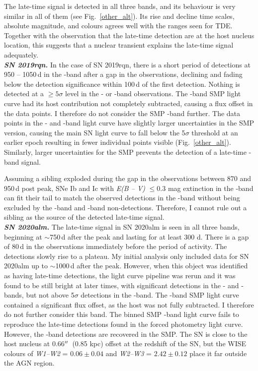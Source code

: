 \documentclass[a4paper,oneside,12pt, class=Latex/Classes/PhDthesisPSnPDF, crop=false]{standalone}
\begin{document}
The late-time signal is detected in all three bands, and its behaviour is very similar in all of them (see Fig.~\ref{other_alt}). Its rise and decline time scales, absolute magnitude, and colours agrees well with the ranges seen for TDE. Together with the observation that the late-time detection are at the host nucleus location, this suggests that a nuclear transient explains the late-time signal adequately.\\

\textit{\textbf{SN 2019rqn.}}
In the case of SN 2019rqn, there is a short period of detections at 950 -- 1050\,d in the \ztfr-band after a gap in the observations, declining and fading below the detection significance within 100\,d of the first detection. Nothing is detected at a $\geq 5 \sigma$ level in the \ztfg- or \ztfi-band observations. The \ztfi-band SMP light curve had its host contribution not completely subtracted, causing a flux offset in the data points. I therefore do not consider the SMP \ztfi-band further. The data points in the \ztfg- and \ztfr-band light curve have slightly larger uncertainties in the SMP version, causing the main SN light curve to fall below the 5$\sigma$ threshold at an earlier epoch resulting in fewer individual points visible (Fig.~\ref{other_alt}). Similarly, larger uncertainties for the SMP prevents the detection of a late-time \ztfr-band signal.

Assuming a sibling exploded during the gap in the observations between 870 and 950\,d post peak, SNe Ib and Ic with \textit{E(B -- V)} $\leq 0.3$ mag extinction in the \ztfr-band can fit their tail to match the observed detections in the \ztfr-band without being excluded by the \ztfg-band and \ztfi-band non-detections. Therefore, I cannot rule out a sibling as the source of the detected late-time signal.\\

\textit{\textbf{SN 2020alm.}}
The late-time signal in SN 2020alm is seen in all three bands, beginning at $\sim$750\,d after the peak and lasting for at least 300 d. There is a gap of 80\,d in the observations immediately before the period of activity. The detections slowly rise to a plateau. My initial analysis only included data for SN 2020alm up to $\sim$1000\,d after the peak. However, when this object was identified as having late-time detections, the light curve pipeline was rerun and it was found to be still bright at later times, with significant detections in the \ztfr- and \ztfi-bands, but not above 5$\sigma$ detections in the \ztfg-band. The \ztfi-band SMP light curve contained a significant flux offset, as the host was not fully subtracted. I therefore do not further consider this band. The binned SMP \ztfr-band light curve fails to reproduce the late-time detections found in the forced photometry light curve. However, the \ztfg-band detections are recovered in the SMP. The SN is close to the host nucleus at 0.66$^{\prime\prime}$~(0.85 kpc) offset at the redshift of the SN, but the WISE colours of \textit{W1--W2} = $0.06\pm0.04$ and \textit{W2--W3} = $2.42\pm0.12$ place it far outside the AGN region. 
\end{document}
